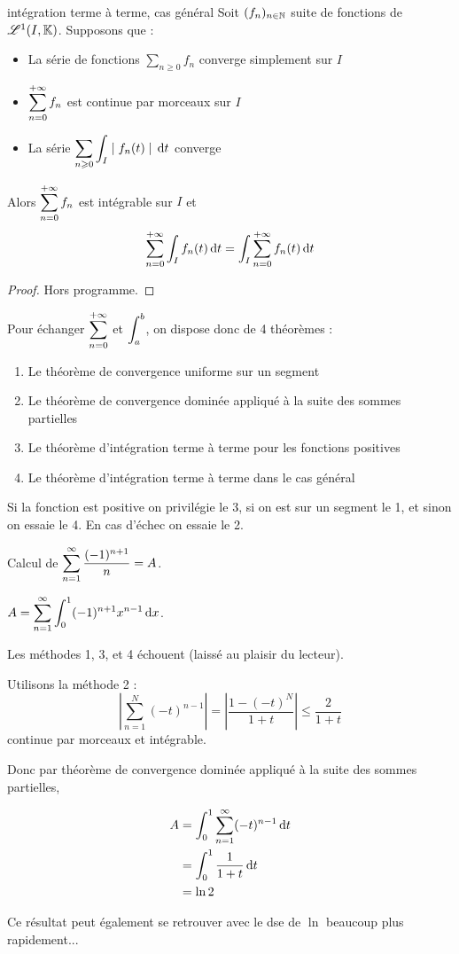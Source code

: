 \begin{theoreme}{intégration terme à terme, cas général}{}
    Soit $(f_n)_{n \in \mathbb{N}}$ suite de fonctions de $\mathscr L^1(I, \mathbb{K})$. Supposons que :
    \begin{itemize}
        \item La série de fonctions $\sum_{n \geqslant 0} f_n$ converge simplement sur $I$
        \item $\displaystyle \sum_{n = 0}^{+ \infty} f_n$ est continue par morceaux sur $I$
        \item La série $\displaystyle \sum_{n \geqslant 0 } \int_I \mid f_n(t) \mid \,\mathrm{d}t$ converge
    \end{itemize}
    Alors $\displaystyle \sum_{n = 0 }^{+ \infty} f_n$ est intégrable sur $I$ et 
    $$\sum_{n = 0}^{+ \infty} \int_I f_n(t) \,\mathrm{d}t = \int_I \sum_{n = 0}^{+ \infty} f_n(t) \,\mathrm{d}t$$
\end{theoreme}

\begin{proof}
    Hors programme. 
\end{proof}

Pour échanger $\displaystyle \sum_{n = 0}^{+ \infty}$ et $\displaystyle \int_a^b$, on dispose donc de 4 théorèmes : 
\begin{enumerate}
    \item Le théorème de convergence uniforme sur un segment 
    \item Le théorème de convergence dominée appliqué à la suite des sommes partielles
    \item Le théorème d'intégration terme à terme pour les fonctions positives
    \item Le théorème d'intégration terme à terme dans le cas général
\end{enumerate}

Si la fonction est positive on privilégie le 3, si on est sur un segment le 1, et sinon 
on essaie le 4. En cas d'échec on essaie le 2. 

\begin{exemple}
    Calcul de $\displaystyle \sum_{n = 1}^{\infty} \frac{(-1)^{n + 1}}{n} = A$. 

    $A = \displaystyle \sum_{n = 1}^{\infty} \int_{0}^{1} (-1)^{n + 1} x^{n - 1} \,\mathrm{d}x$. 

    Les méthodes 1, 3, et 4 échouent (laissé au plaisir du lecteur).

    Utilisons la méthode 2 : 
    $$ \left| \sum_{n = 1}^{N } (-t)^{n - 1} \right| = \left| \frac{1 - (-t)^N}{1 + t} \right| \leqslant \frac{2}{1 + t}$$
    continue par morceaux et intégrable. 

    Donc par théorème de convergence dominée appliqué à la suite des sommes partielles, 

    \begin{align}
        A & = \int_{0}^{1} \sum_{n = 1}^{ \infty} (-t)^{n - 1} \,\mathrm{d}t \\
        & = \int_0^1 \frac{1}{1 + t} \,\mathrm{d}t \\
        & = \ln 2
    \end{align}

    Ce résultat peut également se retrouver avec le dse de $\ln$ beaucoup plus rapidement...
\end{exemple}

